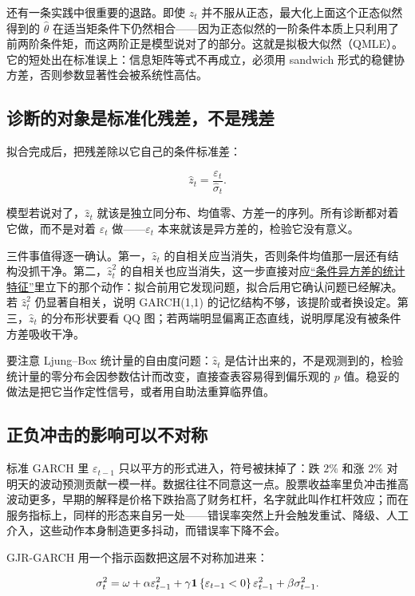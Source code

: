 还有一条实践中很重要的退路。即使 \(z_t\) 并不服从正态，最大化上面这个正态似然得到的 \(\hat\theta\) 在适当矩条件下仍然相合——因为正态似然的一阶条件本质上只利用了前两阶条件矩，而这两阶正是模型说对了的部分。这就是拟极大似然（QMLE）。它的短处出在标准误上：信息矩阵等式不再成立，必须用 sandwich 形式的稳健协方差，否则参数显著性会被系统性高估。

\subsection{诊断的对象是标准化残差，不是残差}

拟合完成后，把残差除以它自己的条件标准差：

\[
\hat z_t=\frac{\varepsilon_t}{\hat\sigma_t}.
\]

模型若说对了，\(\hat z_t\) 就该是独立同分布、均值零、方差一的序列。所有诊断都对着它做，而不是对着 \(\varepsilon_t\) 做——\(\varepsilon_t\) 本来就该是异方差的，检验它没有意义。

三件事值得逐一确认。第一，\(\hat z_t\) 的自相关应当消失，否则条件均值那一层还有结构没抓干净。第二，\(\hat z_t^2\) 的自相关也应当消失，这一步直接对应\hyperref[sec:11-Mathematical-Statistics/10-GARCH-and-Volatility/01]{``条件异方差的统计特征''}里立下的那个动作：拟合前用它发现问题，拟合后用它确认问题已经解决。若 \(\hat z_t^2\) 仍显著自相关，说明 GARCH(1,1) 的记忆结构不够，该提阶或者换设定。第三，\(\hat z_t\) 的分布形状要看 QQ 图；若两端明显偏离正态直线，说明厚尾没有被条件方差吸收干净。

要注意 Ljung--Box 统计量的自由度问题：\(\hat z_t\) 是估计出来的，不是观测到的，检验统计量的零分布会因参数估计而改变，直接查表容易得到偏乐观的 \(p\) 值。稳妥的做法是把它当作定性信号，或者用自助法重算临界值。

\subsection{正负冲击的影响可以不对称}

标准 GARCH 里 \(\varepsilon_{t-1}\) 只以平方的形式进入，符号被抹掉了：跌 \(2\%\) 和涨 \(2\%\) 对明天的波动预测贡献一模一样。数据往往不同意这一点。股票收益率里负冲击推高波动更多，早期的解释是价格下跌抬高了财务杠杆，名字就此叫作杠杆效应；而在服务指标上，同样的形态来自另一处——错误率突然上升会触发重试、降级、人工介入，这些动作本身制造更多抖动，而错误率下降不会。

GJR-GARCH 用一个指示函数把这层不对称加进来：

\[
\sigma_t^2=\omega+\alpha\varepsilon_{t-1}^2+\gamma\mathbf{1}\left\{\varepsilon_{t-1}<0\right\}\varepsilon_{t-1}^2+\beta\sigma_{t-1}^2 .
\]

